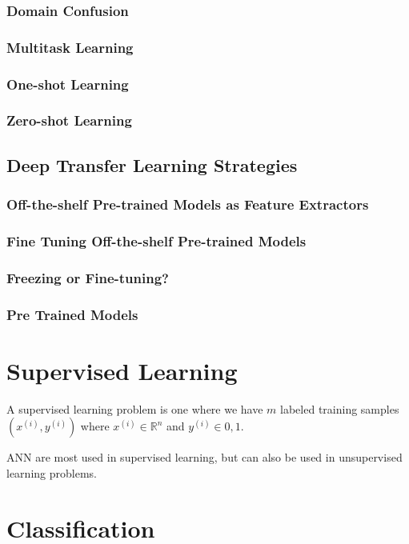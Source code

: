 \subsubsection{Domain Confusion}
\subsubsection{Multitask Learning}
\subsubsection{One-shot Learning}
\subsubsection{Zero-shot Learning}

\subsection{Deep Transfer Learning Strategies}

\subsubsection{Off-the-shelf Pre-trained Models as Feature Extractors}
\subsubsection{Fine Tuning Off-the-shelf Pre-trained Models}
\subsubsection{Freezing or Fine-tuning?}
\subsubsection{Pre Trained Models}

\section{Supervised Learning}

A supervised learning problem is one where we have $m$ labeled training samples $(x^{(i)}, y^{(i)})$ where $x^{(i)} \in \mathbb{R}^n$ and $y^{(i)} \in {0, 1}$.

\ac{ANN} are most used in supervised learning, but can also be used in unsupervised learning problems.

\section{Classification}

